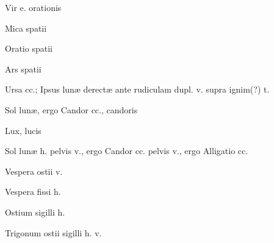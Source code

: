  {} {\mktsStyleItalic{}Vir e. orationis\/}


 {} {\mktsStyleItalic{}Mica spatii\/}


 {} {\mktsStyleItalic{}Oratio spatii\/}


 {} {\mktsStyleItalic{}Ars spatii\/}


 {\mktsStyleItalic{}Ursa cc.\/}; {\mktsStyleItalic{}Ipsus lunæ derectæ ante rudiculam dupl. v. supra ignim(?) t.\/}


 {} {\mktsStyleItalic{}Sol lunæ\/}, ergo {\mktsStyleItalic{}Candor cc.\/}, candoris


 {\mktsStyleItalic{}Lux\/}, lucis


 {} {\mktsStyleItalic{}Sol lunæ h. pelvis v.\/}, ergo {\mktsStyleItalic{}Candor cc. pelvis v.\/}, ergo {\mktsStyleItalic{}Alligatio cc.\/}


 {} {\mktsStyleItalic{}Vespera ostii v.\/}


 {} {\mktsStyleItalic{}Vespera fissi h.\/}


 {} {\mktsStyleItalic{}Ostium sigilli h.\/}


 {} {\mktsStyleItalic{}Trigonum ostii sigilli h. v.\/}



